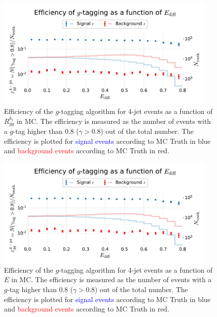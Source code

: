 \begin{figure}
  \centerfloat
  \includegraphics[width=0.95\textwidth, trim=10 10 10 45, clip, page=9]{figures/quarks/efficiency_events-down_sample=1.00-ML_vars=vertex-selection=b-ejet_min=4-n_iter_RS_lgb=99-n_iter_RS_xgb=9-cdot_cut=0.90-version=19-njet=4.pdf}
  \caption[$g$-Tagging Efficiency for 4-Jet Events in MC as a Function of $R_{gg}^\mathrm{k_t}$]
          {Efficiency of the $g$-tagging algorithm for 4-jet events as a function of $R_{gg}^{k_t}$  in MC. The efficiency is measured as the number of events with a $g$-tag higher than 0.8 ($\gamma > 0.8$) out of the total number. The efficiency is plotted for \textcolor{blue}{signal events} according to MC Truth in blue and \textcolor{red}{background events} according to MC Truth in red.
          } 
  \label{fig:q:effiency_gtag_R_gg_kt}
\end{figure}
\begin{figure}
  \centerfloat
  \includegraphics[width=0.95\textwidth, trim=10 10 10 45, clip, page=10]{figures/quarks/efficiency_events-down_sample=1.00-ML_vars=vertex-selection=b-ejet_min=4-n_iter_RS_lgb=99-n_iter_RS_xgb=9-cdot_cut=0.90-version=19-njet=4.pdf}
  \caption[$g$-Tagging Efficiency for 4-Jet Events in MC as a Function of $R_{gg}^\mathrm{CA}$]
          {Efficiency of the $g$-tagging algorithm for 4-jet events as a function of $E$  in MC. The efficiency is measured as the number of events with a $g$-tag higher than 0.8 ($\gamma > 0.8$) out of the total number. The efficiency is plotted for \textcolor{blue}{signal events} according to MC Truth in blue and \textcolor{red}{background events} according to MC Truth in red.
          } 
  \label{fig:q:effiency_gtag_R_gg_CA}
\end{figure}














